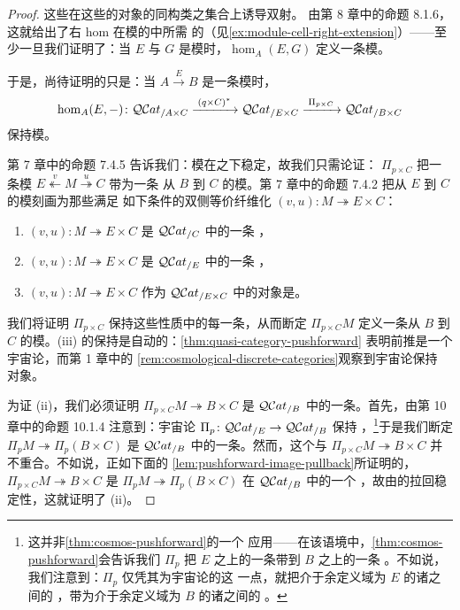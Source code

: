 \begin{proof}
这些\trEquivalence{}在这些\trQuasiCategory{}的对象的同构类之集合上诱导双射。
由第 8 章中的命题 8.1.6，这就给出了右 hom 在模的\trVirtualEquipment{}中所需
的\trUniversalProperty（见\cref{ex:module-cell-right-extension}）——至少一旦我们证明了：当 $E$ 与 $G$
是模时，$\hom_{A}(E,G)$ 定义一条模。

于是，尚待证明的只是：当 $A\xrightarrow{E}B$
是一条模时，\trFunctor
\[
\hom_{A}(E,-)\colon\mathcal{Q}\mathcal{C}at_{/A\times C}
  \xrightarrow{\;(q\times C)^{*}\;}\mathcal{Q}\mathcal{C}at_{/E\times C}
  \xrightarrow{\;\Pi_{p\times C}\;}\mathcal{Q}\mathcal{C}at_{/B\times C}
\]
保持模。

第 7 章中的命题 7.4.5 告诉我们：模在\trPullback{}之下稳定，故我们只需论证：
$\Pi_{p\times C}$ 把一条模
$E\overset{v}{\twoheadleftarrow}M\overset{u}{\twoheadrightarrow}C$ 带为一条
从 $B$ 到 $C$ 的模。第 7 章中的命题 7.4.2 把从 $E$ 到 $C$ 的模刻画为那些满足
如下条件的双侧等价纤维化 $(v,u)\colon M\twoheadrightarrow E\times C$：
\begin{enumerate}[label=(\roman*)]
\item $(v,u)\colon M\twoheadrightarrow E\times C$ 是 $\mathcal{Q}\mathcal{C}at_{/C}$ 中的一条%
  \trCocartesianFibration，
\item $(v,u)\colon M\twoheadrightarrow E\times C$ 是 $\mathcal{Q}\mathcal{C}at_{/E}$ 中的一条%
  \trCartesianFibration，
\item $(v,u)\colon M\twoheadrightarrow E\times C$ 作为 $\mathcal{Q}\mathcal{C}at_{/E\times C}$
  中的对象是\trDiscrete。
\end{enumerate}
我们将证明 $\Pi_{p\times C}$ 保持这些性质中的每一条，从而断定 $\Pi_{p\times C}M$
定义一条从 $B$ 到 $C$ 的模。(iii) 的保持是自动的：\cref{thm:quasi-category-pushforward}
表明前推是一个宇宙论\trFunctor，而第 1 章中的%
\cref{rem:cosmological-discrete-categories}观察到宇宙论\trFunctor{}保持%
\trDiscrete{}对象。

为证 (ii)，我们必须证明 $\Pi_{p\times C}M\twoheadrightarrow B\times C$ 是
$\mathcal{Q}\mathcal{C}at_{/B}$ 中的一条\trCartesianFibration。首先，由第 10 章中的命题 10.1.4
注意到：宇宙论\trFunctor{} $\Pi_{p}\colon\mathcal{Q}\mathcal{C}at_{/E}\to\mathcal{Q}\mathcal{C}at_{/B}$ 保持%
\trCartesianFibration，\footnote{这并非\cref{thm:cosmos-pushforward}的一个
应用——在该语境中，\cref{thm:cosmos-pushforward}会告诉我们 $\Pi_{p}$ 把
$E$ 之上的一条\trCocartesianFibration{}带到 $B$ 之上的一条%
\trCocartesianFibration。不如说，我们注意到：$\Pi_{p}$ 仅凭其为宇宙论的这
一点，就把介于余定义域为 $E$ 的诸\trIsofibration{}之间的%
\trCartesianFibration，带为介于余定义域为 $B$ 的诸\trIsofibration{}之间的%
\trCartesianFibration。}于是我们断定 $\Pi_{p}M\twoheadrightarrow\Pi_{p}(B\times C)$
是 $\mathcal{Q}\mathcal{C}at_{/B}$ 中的一条\trCartesianFibration。然而，这个\trFunctor{}与
$\Pi_{p\times C}M\twoheadrightarrow B\times C$ 并不重合。不如说，正如下面的
\cref{lem:pushforward-image-pullback}所证明的，$\Pi_{p\times C}M\twoheadrightarrow B\times C$
是 $\Pi_{p}M\twoheadrightarrow\Pi_{p}(B\times C)$ 在 $\mathcal{Q}\mathcal{C}at_{/B}$ 中的一个%
\trPullback，故由\trCartesianFibration{}的拉回稳定性，这就证明了 (ii)。


\end{proof}
